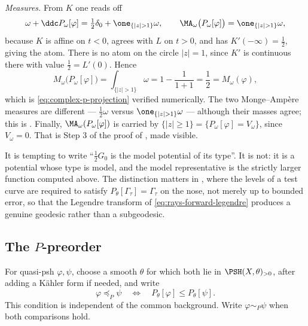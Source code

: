 \begin{example}
\emph{Measures.}  From $K$ one reads off
\[
 \omega+\ddc P_\omega[\varphi]
 =\tfrac12\delta_0+\one_{\{|z|>1\}}\omega,
 \qquad
 \MA_\omega\bigl(P_\omega[\varphi]\bigr)
 =\one_{\{|z|>1\}}\omega ,
\]
because $K$ is affine on $t<0$, agrees with $L$ on $t>0$, and has
$K'(-\infty)=\frac12$, giving the atom.  There is no atom on the circle
$|z|=1$, since $K'$ is continuous there with value
$\frac12=L'(0)$.  Hence
\[
 M_\omega\bigl(P_\omega[\varphi]\bigr)
 =\int_{\{|z|>1\}}\omega
 =1-\frac{1}{1+1}=\frac12
 =M_\omega(\varphi),
\]
which is \eqref{eq:complex-p-projection} verified numerically.  The two
Monge--Amp\`ere measures are different --- $\frac12\omega$ versus
$\one_{\{|z|>1\}}\omega$ --- although their masses agree; this is
.  Finally,
$\MA_\omega(P_\omega[\varphi])$ is carried by
$\{|z|\geq1\}=\{P_\omega[\varphi]=V_\omega\}$, since $V_\omega=0$.
That is Step 3 of the proof of , made
visible.
\end{example}

\begin{remark}
\label{rem:ch51-model-vs-type}
It is tempting to write ``$\frac12G_0$ is the model potential of its
type''.  It is not: it is a potential whose type is model, and the model
representative is the strictly larger function computed above.  The
distinction matters in , where the levels of
a test curve are required to satisfy
$P_\theta[\Gamma_\tau]=\Gamma_\tau$ on the nose, not merely up to
bounded error, so that the Legendre transform of
\eqref{eq:rays-forward-legendre} produces a genuine geodesic rather than
a subgeodesic.
\end{remark}

\subsection{The \texorpdfstring{$P$}{P}-preorder}
\label{sec:ch51-p-preorder}

\begin{definition}[$P$-preorder]
\label{def:complex-p-preorder}
For quasi-psh $\varphi,\psi$, choose a smooth $\theta$ for which both
lie in $\PSH(X,\theta)_{>0}$, after adding a K\"ahler form if needed,
and write
\[
 \varphi\preceq_P\psi
 \quad\Longleftrightarrow\quad
 P_\theta[\varphi]\leq P_\theta[\psi].
\tag{51.26}\label{eq:complex-p-preorder}
\]
This condition is independent of the common background.  Write
$\varphi\sim_P\psi$ when both comparisons hold.
\end{definition}

